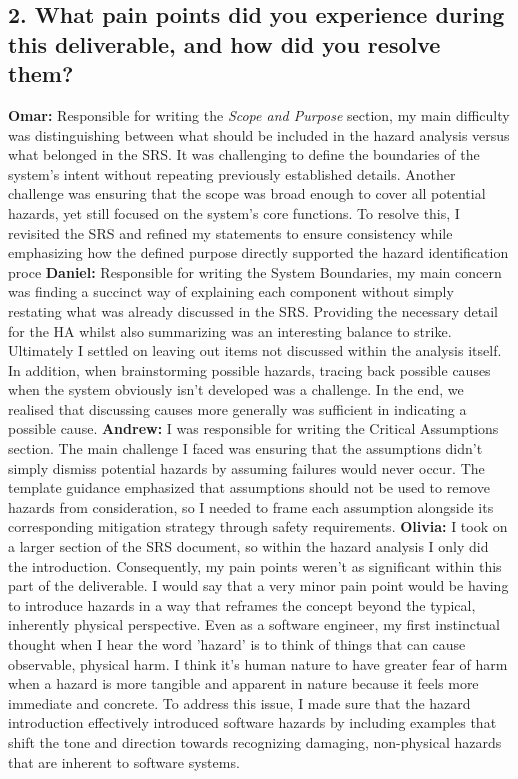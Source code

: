 \documentclass{article}
\begin{document}
\subsection*{2. What pain points did you experience during this deliverable, and how
did you resolve them?}
\bigskip
\textbf{Omar: }Responsible for writing the \textit{Scope and Purpose} section, my main difficulty was distinguishing between what should be included in the hazard analysis versus what belonged in the SRS. It was challenging to define the boundaries of the system’s intent without repeating previously established details. Another challenge was ensuring that the scope was broad enough to cover all potential hazards, yet still focused on the system’s core functions. To resolve this, I revisited the SRS and refined my statements to ensure consistency while emphasizing how the defined purpose directly supported the hazard identification proce\newline
\newline
\textbf{Daniel: } Responsible for writing the System Boundaries, my main concern was finding a succinct way of explaining each component without simply restating what was already discussed in the SRS. Providing the necessary detail for the HA whilst also summarizing was an interesting balance to strike. Ultimately I settled on leaving out items not discussed within the analysis itself. In addition, when brainstorming possible hazards, tracing back possible causes when the system obviously isn't developed was a challenge. In the end, we realised that discussing causes more generally was sufficient in indicating a possible cause.
\newline
\newline
\textbf{Andrew: } I was responsible for writing the Critical Assumptions section. The main challenge I faced was ensuring that the assumptions didn't simply dismiss potential hazards by assuming failures would never occur. The template guidance emphasized that assumptions should not be used to remove hazards from consideration, so I needed to frame each assumption alongside its corresponding mitigation strategy through safety requirements. 
\newline
\newline
\textbf{Olivia: } I took on a larger section of the SRS document, so within the hazard analysis I only did the introduction. Consequently, my pain points weren’t as significant within this part of the deliverable. I would say that a very minor pain point would be having to introduce hazards in a way that reframes the concept beyond the typical, inherently physical perspective. Even as a software engineer, my first instinctual thought when I hear the word 'hazard' is to think of things that can cause observable, physical harm. I think it's human nature to have greater fear of harm when a hazard is more tangible and apparent in nature because it feels more immediate and concrete. To address this issue, I made sure that the hazard introduction effectively introduced software hazards by including examples that shift the tone and direction towards recognizing damaging, non-physical hazards that are inherent to software systems.
\end{document}
